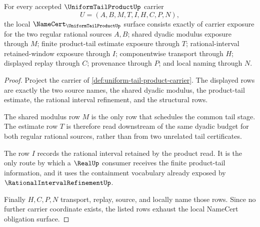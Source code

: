 \begin{theorem}
\label{thm:uniform-tail-product-namecert-obligations}
For every accepted $\UniformTailProductUp$ carrier
$$
U=(A,B,M,T,I,H,C,P,N),
$$
the local $\NameCert_{\UniformTailProductUp}$ surface consists exactly of carrier exposure for the two regular rational sources $A,B$; shared dyadic modulus exposure through $M$; finite product-tail estimate exposure through $T$; rational-interval retained-window exposure through $I$; componentwise transport through $H$; displayed replay through $C$; provenance through $P$; and local naming through $N$.
\end{theorem}
\begin{proof}
Project the carrier of \autoref{def:uniform-tail-product-carrier}. The displayed rows are exactly the two source names, the shared dyadic modulus, the product-tail estimate, the rational interval refinement, and the structural rows.

The shared modulus row $M$ is the only row that schedules the common tail stage. The estimate row $T$ is therefore read downstream of the same dyadic budget for both regular rational sources, rather than from two unrelated tail certificates.

The row $I$ records the rational interval retained by the product read. It is the only route by which a $\RealUp$ consumer receives the finite product-tail information, and it uses the containment vocabulary already exposed by $\RationalIntervalRefinementUp$.

Finally $H,C,P,N$ transport, replay, source, and locally name those rows. Since no further carrier coordinate exists, the listed rows exhaust the local NameCert obligation surface.
\end{proof}

